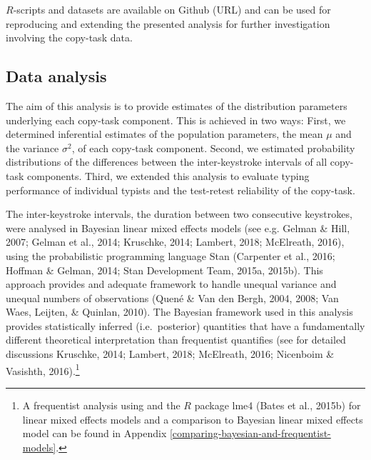 \documentclass[,man,floatsintext]{apa6}
\let\rmarkdownfootnote\footnote%
\def\footnote{\protect\rmarkdownfootnote}
\begin{document}
\(R\)-scripts and datasets are available on Github (URL) and can be used for reproducing and extending the presented analysis for further investigation involving the copy-task data.

\hypertarget{data-analysis}{%
\subsection{Data analysis}\label{data-analysis}}

The aim of this analysis is to provide estimates of the distribution parameters underlying each copy-task component. This is achieved in two ways: First, we determined inferential estimates of the population parameters, the mean \(\mu\) and the variance \(\sigma^2\), of each copy-task component. Second, we estimated probability distributions of the differences between the inter-keystroke intervals of all copy-task components. Third, we extended this analysis to evaluate typing performance of individual typists and the test-retest reliability of the copy-task.

The inter-keystroke intervals, the duration between two consecutive keystrokes, were analysed in Bayesian linear mixed effects models (see e.g. Gelman \& Hill, 2007; Gelman et al., 2014; Kruschke, 2014; Lambert, 2018; McElreath, 2016), using the probabilistic programming language Stan (Carpenter et al., 2016; Hoffman \& Gelman, 2014; Stan Development Team, 2015a, 2015b). This approach provides and adequate framework to handle unequal variance and unequal numbers of observations (Quené \& Van den Bergh, 2004, 2008; Van Waes, Leijten, \& Quinlan, 2010). The Bayesian framework used in this analysis provides statistically inferred (i.e.~posterior) quantities that have a fundamentally different theoretical interpretation than frequentist quantifies (see for detailed discussions Kruschke, 2014; Lambert, 2018; McElreath, 2016; Nicenboim \& Vasishth, 2016).\footnote{A frequentist analysis using and the \(R\) package lme4 (Bates et al., 2015b) for linear mixed effects models and a comparison to Bayesian linear mixed effects model can be found in Appendix \ref{comparing-bayesian-and-frequentist-models}.}
\end{document}
